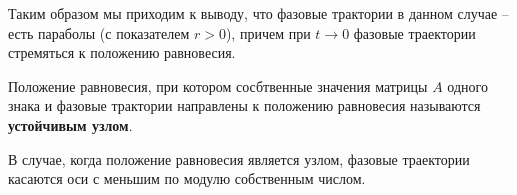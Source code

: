 \documentclass[a4paper, 12pt]{article}
\begin{document}
\begin{enumerate}
\begin{enumerate}
        Таким образом мы приходим к выводу, что фазовые трактории в данном случае -- есть параболы (с показателем $r > 0$), причем при $t \rightarrow 0$ фазовые траектории стремяться к положению равновесия.

        \begin{definition}
          Положение равновесия, при котором сосбтвенные значения матрицы $A$ одного знака и фазовые трактории направлены к положению равновесия называются \textbf{устойчивым узлом}.
        \end{definition}

        \begin{remark}
          В случае, когда положение равновесия является узлом, фазовые траектории касаются оси с меньшим по модулю собственным числом.
        \end{remark}

      \end{enumerate}

    \end{enumerate}
\end{document}

